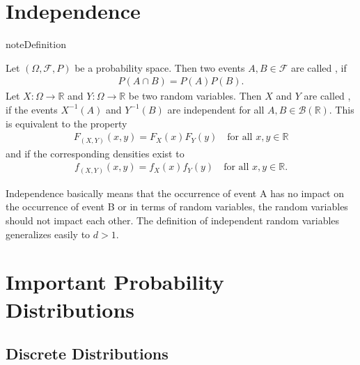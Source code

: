 \documentclass[letterpaper,10pt,english]{jupyterBook}
\begin{document}
\section{Independence}
\label{\detokenize{fund/fundprob:independence}}
\begin{sphinxadmonition}{note}{Definition}

\sphinxAtStartPar
Let \((\Omega, \mathcal{F}, P)\) be a probability space. Then two events \(A, B \in \mathcal{F}\) are called , if
\begin{equation*}
\begin{split} P(A \cap B) = P(A) P(B).\end{split}
\end{equation*}
\sphinxAtStartPar
Let \(X: \Omega \rightarrow \mathbb{R}\) and \(Y: \Omega \rightarrow \mathbb{R}\) be two random variables. Then \(X\) and \(Y\) are called , if the events \(X^{-1}(A)\) and \(Y^{-1}(B)\) are independent for all \(A, B \in \mathcal{B}(\mathbb{R})\). This is equivalent to the property
\begin{equation*}
\begin{split}F_{(X, Y)}(x, y) = F_X(x) F_Y(y) \quad \text{for all } x,y \in \mathbb{R}\end{split}
\end{equation*}
\sphinxAtStartPar
and if the corresponding densities exist to
\begin{equation*}
\begin{split}f_{(X, Y)}(x, y) = f_X(x) f_Y(y) \quad \text{for all } x,y \in \mathbb{R}.\end{split}
\end{equation*}\end{sphinxadmonition}

\sphinxAtStartPar
Independence basically means that the occurrence of event A has no impact on the occurrence of event B or in terms of random variables, the random variables should not impact each other. The definition of independent random variables generalizes easily to \(d > 1\).


\section{Important Probability Distributions}
\label{\detokenize{fund/fundprob:important-probability-distributions}}

\subsection{Discrete Distributions}
\label{\detokenize{fund/fundprob:discrete-distributions}}
\end{document}
